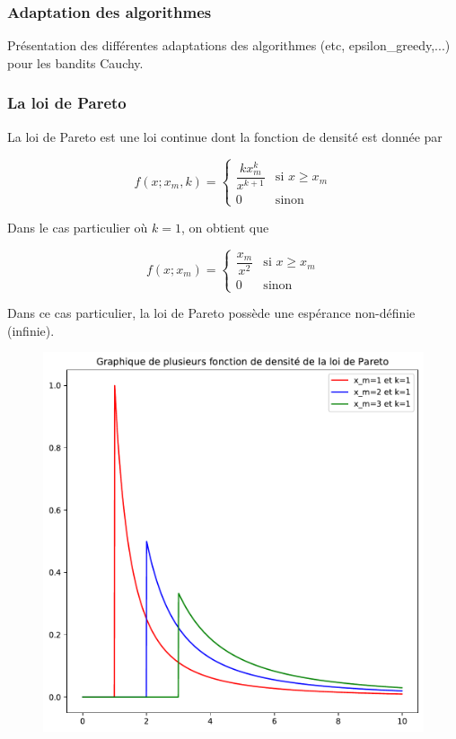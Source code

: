 \documentclass[8pt, sans]{beamer}
\begin{document}
\begin{frame}
\frametitle{Adaptation des algorithmes}
Présentation des différentes adaptations des algorithmes (etc, epsilon\_greedy,...) pour les bandits Cauchy.
\end{frame}

\begin{frame}
\frametitle{La loi de Pareto}
La loi de Pareto est une loi continue dont la fonction de densité est donnée par

$$f(x;x_m,k)=\left\{
\begin{array}{ll}
\dfrac{kx_m^k}{x^{k+1}} & \text{si $x\geq x_m$}\\
0                       & \text{sinon}
\end{array}
\right.
$$

Dans le cas particulier où $k=1$, on obtient que 

$$f(x;x_m)=\left\{
\begin{array}{ll}
\dfrac{x_m}{x^{2}} & \text{si $x\geq x_m$}\\
0                       & \text{sinon}
\end{array}
\right.
$$

Dans ce cas particulier, la loi de Pareto possède une espérance non-définie (infinie).

\begin{figure}[H]
\begin{center}
\includegraphics[scale=0.25]{graphiques_Pareto.pdf}
\end{center}
\end{figure}


\end{frame}
\end{document}
